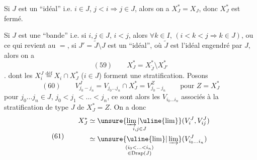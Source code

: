 
Si $J$ est un ``idéal'' i.e. $i\in J$, $j<i\Longrightarrow j\in J$,
alors on a $X_J^*=X_J$, donc $X_J^*$ est fermé.

Si $J$ est une ``bande'' i.e. si $i,j\in J$, $i<j$,
alors $\forall k\in I$, $(i<k<j\Longrightarrow k\in J)$,
ou ce qui revient au $=$, si $J'=\widetilde J\setminus J$ est
un ``idéal'', où $\widetilde J$ est l'idéal engendré par $J$,
alors on a
\[
(59)\qquad X_J^*=X_{\widetilde J}^*\setminus X_{J'}^*
\]
.
dont les $X_i^J\overset{\mathrm{déf}}{=}X_i\cap X_J^*$ ($i\in J$)
forment une stratification. Posons
\[
(60)\qquad V_{j_0-j_n}^J
=V_{j_0\ldots j_n}\cap X_J^*=V_{j_0-j_n}^Z
\qquad\text{pour }Z=X_J^*
\]
pour $j_0\ldots j_n\in J$, $j_0<j_1<\ldots<j_n$,
ce sont alors les $V_{i_0\ldots i_n}$ associés à la stratification
de type $J$ de $X_J^*=Z$. On a donc
\[
(61)\qquad\begin{aligned}
X_J^*&\simeq\underset{i,j\in J}{\unsure{\varinjlim|\uline{\lim}}}
(V_i^J,V_{ij}^J)\\
&\simeq\underset{\substack{(i_0<\ldots<i_n)\\\in\operatorname{Drap}(J)}}{\unsure{\uline{\lim}|\varinjlim}}
(V_{i_0\ldots i_n}^J)
\end{aligned}
\]



